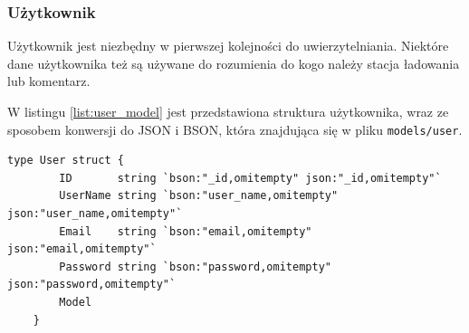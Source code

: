 \subsubsection{Użytkownik}
Użytkownik jest niezbędny w pierwszej kolejności do uwierzytelniania. Niektóre dane użytkownika też są używane do rozumienia do kogo należy stacja ładowania lub komentarz.

W listingu \ref{list:user_model} jest przedstawiona struktura użytkownika, wraz ze sposobem konwersji do JSON i BSON, która znajdująca się w pliku \texttt{models/user}.
\begin{lstlisting}[label=list:user_model,caption=Model danych użytkownika,basicstyle=\tiny\ttfamily]
    type User struct {
        ID       string `bson:"_id,omitempty" json:"_id,omitempty"`
        UserName string `bson:"user_name,omitempty" json:"user_name,omitempty"`
        Email    string `bson:"email,omitempty" json:"email,omitempty"`
        Password string `bson:"password,omitempty" json:"password,omitempty"`
        Model
    }
\end{lstlisting}

% 


